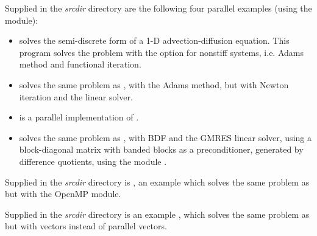\vspace{0.2in}\noindent Supplied in the
{\em srcdir} directory are the following
four parallel examples (using the {\nvecp} module):
\begin{itemize}
\item {} solves the semi-discrete form of a 1-D
  advection-diffusion equation.
  \newline
  This program solves the problem with the option for nonstiff
  systems, i.e. Adams method and functional iteration.
\item {}
  solves the same problem as , with the Adams method,
  but with Newton iteration and the  linear solver.
\item {}
  is a parallel implementation of .
\item {}
  solves the same problem as , with BDF and the GMRES linear
  solver, using a block-diagonal matrix with banded blocks as a preconditioner, 
  generated by difference quotients, using the module {\cvbbdpre}.
\end{itemize}

\vspace{0.2in}\noindent Supplied in the
{\em srcdir} directory is
, an example which solves the same problem as
 but with the OpenMP {\nvector} module.

\vspace{0.2in}\noindent Supplied in the
{\em srcdir} directory is an example
, which solves the same problem as
 but with {\hypre} vectors instead of
{\sundials} parallel vectors.

